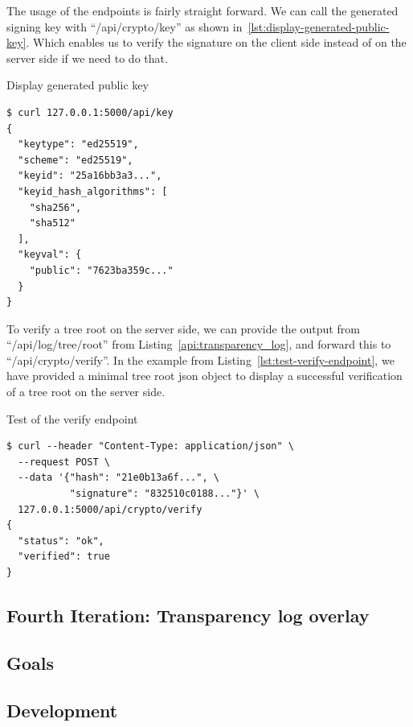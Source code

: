 \documentclass[../Main/thesis.tex]{subfiles}
\begin{document}
The usage of the endpoints is fairly straight forward. We can call the generated
signing key with ``/api/crypto/key'' as shown
in~\ref{lst:display-generated-public-key}. Which enables us to verify the
signature on the client side instead of on the server side if we need to do
that.

\begin{listing}[H]
\caption{Display generated public key}
\label{lst:display-generated-public-key}
\begin{verbatim}
$ curl 127.0.0.1:5000/api/key
{
  "keytype": "ed25519",
  "scheme": "ed25519",
  "keyid": "25a16bb3a3...",
  "keyid_hash_algorithms": [
    "sha256",
    "sha512"
  ],
  "keyval": {
    "public": "7623ba359c..."
  }
}
\end{verbatim}
\end{listing}

To verify a tree root on the server side, we can provide the output from
``/api/log/tree/root'' from Listing~\ref{api:transparency_log}, and forward this
to ``/api/crypto/verify''. In the example from
Listing~\ref{lst:test-verify-endpoint}, we have provided a minimal tree root
json object to display a successful verification of a tree root on the server
side.

\begin{listing}[H]
\caption{Test of the verify endpoint}
\label{lst:test-verify-endpoint}
\begin{verbatim}
$ curl --header "Content-Type: application/json" \
  --request POST \
  --data '{"hash": "21e0b13a6f...", \
           "signature": "832510c0188..."}' \
  127.0.0.1:5000/api/crypto/verify
{
  "status": "ok",
  "verified": true
}
\end{verbatim}
\end{listing}


\subsection{Fourth Iteration: Transparency log overlay}%
\label{sub:transparency_overlay}

\subsection*{Goals}%
\label{sub:fourth_iteration_goals}

\subsection*{Development}%
\label{sub:fourth_iteration_development}
\end{document}
